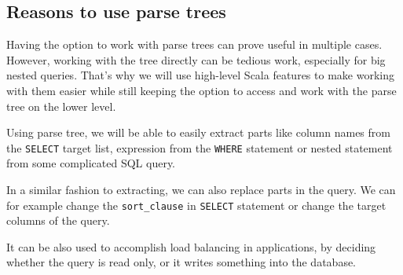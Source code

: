 \subsection{Reasons to use parse trees}
Having the option to work with parse trees can prove useful in multiple cases.\cite{Parse tree usage} However, working with the tree directly can be tedious work, especially for big nested queries. That's why we will use high-level Scala features to make working with them easier while still keeping the option to access and work with the parse tree on the lower level.
\begin{description}[font=$\bullet$~\normalfont\scshape\color{black}\\]
\item [Extracting specific part of query] \hfill \newline
Using parse tree, we will be able to easily extract parts like column names from the \texttt{SELECT} target list, expression from the \texttt{WHERE} statement or nested statement from some complicated SQL query.
\item [Modifying part of the query string] \hfill \newline
In a similar fashion to extracting, we can also replace parts in the query. We can for example change the \texttt{sort\_clause} in \texttt{SELECT} statement or change the target columns of the query.
\item [Determining type of query] \hfill \newline
It can be also used to accomplish load balancing in applications, by deciding whether the query is read only, or it writes something into the database.
\end{description}